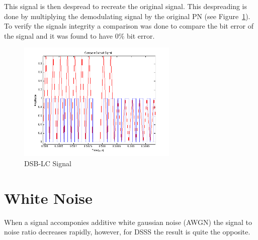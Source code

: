 \documentclass[journal]{IEEEtran}
\begin{document}
This signal is then despread to recreate the original signal. This despreading is done by multiplying the demodulating signal by the original PN (see Figure~\ref{fig:despread}). To verify the signals integrity a comparison was done to compare the bit error of the signal and it was found to have $0\%$ bit error. 

\begin{figure}
\centering
\includegraphics[width=3in]{despread.png}
\caption{DSB-LC Signal}
\label{fig:despread}
\end{figure}

\section{White Noise}
When a signal accomponies additive white gaussian noise (AWGN) the signal to noise ratio decreases rapidly, however, for DSSS the result is quite the opposite. 
\end{document}

